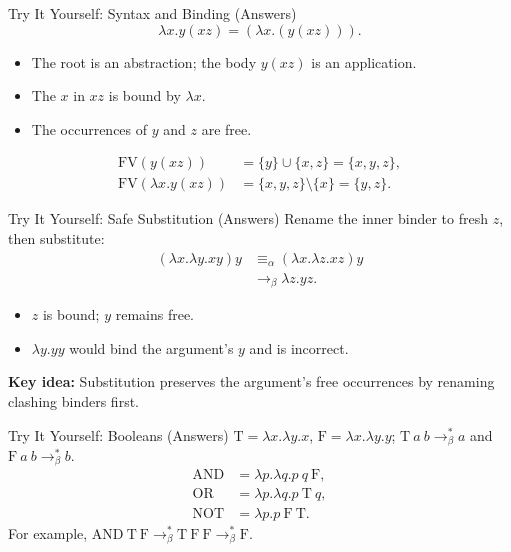 \documentclass{beamer}
\begin{document}
\begin{frame}{Try It Yourself: Syntax and Binding (Answers)}
  \[\lambda x.y(xz)=(\lambda x.(y(xz))).\]
  \begin{itemize}
    \item The root is an abstraction; the body $y(xz)$ is an application.
    \item The $x$ in $xz$ is bound by $\lambda x$.
    \item The occurrences of $y$ and $z$ are free.
  \end{itemize}
  \begin{align*}
    \mathrm{FV}(y(xz))&=\{y\}\cup\{x,z\}=\{x,y,z\},\\
    \mathrm{FV}(\lambda x.y(xz))&=\{x,y,z\}\setminus\{x\}=\{y,z\}.
  \end{align*}
\end{frame}
\begin{frame}{Try It Yourself: Safe Substitution (Answers)}
  Rename the inner binder to fresh $z$, then substitute:
  \begin{align*}
    (\lambda x.\lambda y.xy)y
      &\equiv_\alpha(\lambda x.\lambda z.xz)y\\
      &\to_\beta\lambda z.yz.
  \end{align*}
  \begin{itemize}
    \item $z$ is bound; $y$ remains free.
    \item $\lambda y.yy$ would bind the argument's $y$ and is incorrect.
  \end{itemize}
  \textbf{Key idea:} Substitution preserves the argument's free occurrences
  by renaming clashing binders first.
\end{frame}
\begin{frame}{Try It Yourself: Booleans (Answers)}
  $\mathrm{T}=\lambda x.\lambda y.x$, $\mathrm{F}=\lambda x.\lambda y.y$;
  $\mathrm{T}\ a\ b\to_\beta^* a$ and $\mathrm{F}\ a\ b\to_\beta^* b$.
  \begin{align*}
    \mathrm{AND}&=\lambda p.\lambda q.p\ q\ \mathrm{F},\\
    \mathrm{OR}&=\lambda p.\lambda q.p\ \mathrm{T}\ q,\\
    \mathrm{NOT}&=\lambda p.p\ \mathrm{F}\ \mathrm{T}.
  \end{align*}
  For example, $\mathrm{AND}\ \mathrm{T}\ \mathrm{F}\to_\beta^*\mathrm{T}\ \mathrm{F}\ \mathrm{F}\to_\beta^*\mathrm{F}$.
\end{frame}
\end{document}
